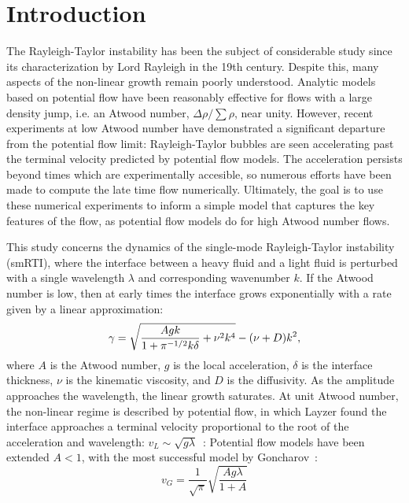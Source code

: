 \section{Introduction}

The Rayleigh-Taylor instability has been the subject of considerable study since its characterization by Lord Rayleigh in the 19th century.
Despite this, many aspects of the non-linear growth remain poorly understood.
Analytic models based on potential flow have been reasonably effective for flows with a large density jump, i.e. an Atwood number, $\Delta \rho / \sum \rho$, near unity.
However, recent experiments at low Atwood number have demonstrated a significant departure from the potential flow limit:
Rayleigh-Taylor bubbles are seen accelerating past the terminal velocity predicted by potential flow models.
The acceleration persists beyond times which are experimentally accesible, so numerous efforts have been made to compute the late time flow numerically.
Ultimately, the goal is to use these numerical experiments to inform a simple model that captures the key features of the flow, as potential flow models do for high Atwood number flows.

This study concerns the dynamics of the single-mode Rayleigh-Taylor instability (smRTI), where the interface between a heavy fluid and a light fluid is perturbed with a single wavelength $\lambda$ and corresponding wavenumber $k$.
If the Atwood number is low, then at early times the interface grows exponentially with a rate given by a linear approximation:
\begin{equation} \elabel{duff0}
\gamma = \sqrt{\frac{A g k}{1 + \pi^{-1/2} k \delta} + \nu^2 k^4} - (\nu + D) k^2,
\end{equation}
where $A$ is the Atwood number,
$g$ is the local acceleration,
$\delta$ is the interface thickness,
$\nu$ is the kinematic viscosity, and
$D$ is the diffusivity.
As the amplitude approaches the wavelength, the linear growth saturates.
At unit Atwood number, the non-linear regime is described by potential flow, in which Layzer found the interface approaches a terminal velocity proportional to the root of the acceleration and wavelength: $v_L \sim \sqrt{g \lambda}$~\cite{Layzer1955}:
Potential flow models have been extended $A < 1$, with the most successful model by Goncharov~\cite{Goncharov2002}:
\begin{equation}
v_G = \frac{1}{\sqrt{\pi}} \sqrt{\frac{A g \lambda}{1+A}}
\end{equation}

